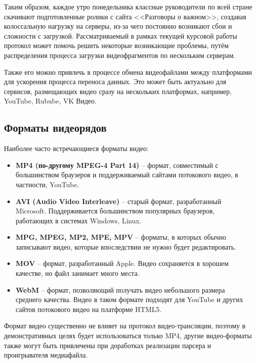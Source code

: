 Таким образом, каждое утро понедельника классные руководители по всей стране скачивают подготовленные ролики с сайта <<Разговоры о важном>>, создавая колоссальную нагрузку на серверы, из-за чего постоянно возникают сбои и сложности с загрузкой. Рассматриваемый в рамках текущей курсовой работы протокол может помочь решить некоторые возникающие проблемы, путём распределения процесса загрузки видеофрагментов по нескольким серверам.

Также его можно привлечь в процессе обмена видеофайлами между платформами для ускорения процесса переноса данных. Это может быть актуально для сервисов, размещающих видео сразу на нескольких платформах, например, YouTube, Rubube, VK Видео. \\

\subsection{Форматы видеорядов}
Наиболее часто встречающиеся форматы видео:
\begin{itemize}
	\item \textbf{MP4 (по-другому MPEG-4 Part 14)} – формат, совместимый с большинством браузеров и поддерживаемый сайтами потокового видео, в частности, YouTube.
	
	\item \textbf{AVI (Audio Video Interleave)} – старый формат, разработанный Microsoft. Поддерживается большинством популярных браузеров, работающих в системах Windows, Linux. 
	
	\item \textbf{MPG, MPEG, MP2, MPE, MPV} – форматы, в которых обычно записывают видео, которые впоследствии не нужно будет редактировать.
	
	\item \textbf{MOV} – формат, разработанный Apple. Видео сохраняется в хорошем качестве, но файл занимает много места.
	
	\item \textbf{WebM} – формат, позволяющий получать видео небольшого размера среднего качества. Видео в таком формате подходят для YouTube и других сайтов потокового видео на платформе HTML5.
\end{itemize}

Формат видео существенно не влияет на протокол видео-трансляции, поэтому в демонстративных целях будет использоваться только MP4, другие видео-форматы также могут быть привлечены при доработках реализации парсера и проигрывателя медиафайла. \\

